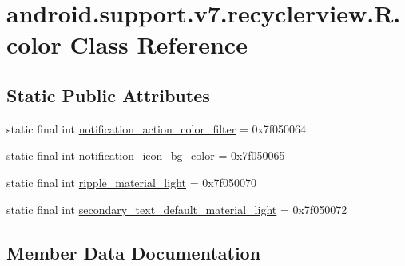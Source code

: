\hypertarget{classandroid_1_1support_1_1v7_1_1recyclerview_1_1R_1_1color}{}\section{android.\+support.\+v7.\+recyclerview.\+R.\+color Class Reference}
\label{classandroid_1_1support_1_1v7_1_1recyclerview_1_1R_1_1color}
\subsection*{Static Public Attributes}
\begin{DoxyCompactItemize}
\item 
static final int \mbox{\hyperlink{classandroid_1_1support_1_1v7_1_1recyclerview_1_1R_1_1color_ac2b79744ae8d17aec154a617579653c0}{notification\+\_\+action\+\_\+color\+\_\+filter}} = 0x7f050064
\item 
static final int \mbox{\hyperlink{classandroid_1_1support_1_1v7_1_1recyclerview_1_1R_1_1color_ad20ca28032de5f2522d2b0f1eb34e96d}{notification\+\_\+icon\+\_\+bg\+\_\+color}} = 0x7f050065
\item 
static final int \mbox{\hyperlink{classandroid_1_1support_1_1v7_1_1recyclerview_1_1R_1_1color_a379c59cd6fe19f2e4c623f037c0b3db0}{ripple\+\_\+material\+\_\+light}} = 0x7f050070
\item 
static final int \mbox{\hyperlink{classandroid_1_1support_1_1v7_1_1recyclerview_1_1R_1_1color_ad9cb37541085c24dce097ad0d62c44f0}{secondary\+\_\+text\+\_\+default\+\_\+material\+\_\+light}} = 0x7f050072
\end{DoxyCompactItemize}


\subsection{Member Data Documentation}
\mbox{\label{classandroid_1_1support_1_1v7_1_1recyclerview_1_1R_1_1color_ac2b79744ae8d17aec154a617579653c0}} 
